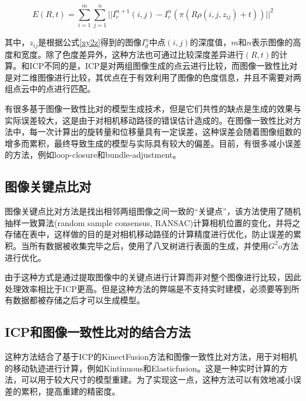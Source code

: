 \documentclass{llncs}
\begin{document}
\begin{CJK}{UTF8}{song}
\begin{equation}
\label{IBMdif}
E(R,t) = \sum^m_{i=1}\sum^n_{j=1}||I^{n+1}_c(i,j)-I^n_c(\pi(R\rho(i,j,z_{ij})+t))||^2
\end{equation}

其中，$z_{ij}$是根据公式\ref{xy2z}得到的图像$I^n_d$中点$(i,j)$的深度值，$m$和$n$表示图像的高度和宽度。除了色度差异外，这种方法也可通过比较深度差异进行$(R,t)$的计算\cite{Kerl2013Large}。和ICP不同的是，ICP是对两组图像生成的点云进行比较，而图像一致性比对是对二维图像进行比较，其优点在于有效利用了图像的色度信息，并且不需要对两组点云中的点进行匹配。

有很多基于图像一致性比对的模型生成技术\cite{6631104,DBLP:conf/iros/KerlSC13}，但是它们共性的缺点是生成的效果与实际误差较大，这是由于对相机移动路径的错误估计造成的。在图像一致性比对方法中，每一次计算出的旋转量和位移量具有一定误差，这种误差会随着图像组数的增多而累积，最终导致生成的模型与实际具有较大的偏差。目前，有很多减小误差的方法，例如loop-closure\cite{DBLP:conf/eccv/KahlerPM16,DBLP:journals/corr/abs-1708-00783}和bundle-adjustment\cite{DBLP:journals/ijcv/UrbanWLH17}。

	\subsection{图像关键点比对}

图像关键点比对方法是找出相邻两组图像之间一致的“关键点”，该方法使用了随机抽样一致算法(random sample consensus, RANSAC)计算相机位置的变化，并将之存储在表中\cite{DBLP:conf/icra/EndresHESCB12}，这样做的目的是对相机移动路径的计算精度进行优化，防止误差的累积。当所有数据被收集完毕之后，\cite{DBLP:conf/icra/EndresHESCB12}使用了八叉树进行表面的生成，并使用$G^2o$方法进行优化\cite{DBLP:conf/icra/KummerleGSKB11}。

由于这种方式是通过提取图像中的关键点进行计算而非对整个图像进行比较，因此处理效率相比于ICP更高。但是这种方法的弊端是不支持实时建模，必须要等到所有数据都被存储之后才可以生成模型。

	\subsection{ICP和图像一致性比对的结合方法}

这种方法结合了基于ICP的KinectFusion方法和图像一致性比对方法，用于对相机的移动轨迹进行计算，例如Kintinuous\cite{DBLP:conf/icra/WhelanJKLM13}和Elasticfusion\cite{DBLP:conf/rss/WhelanLSGD15}。这是一种实时计算的方法，可以用于较大尺寸的模型重建。为了实现这一点，这种方法可以有效地减小误差的累积，提高重建的精密度。


\end{CJK}
\end{document}
